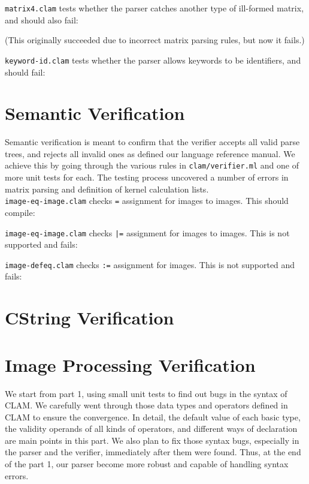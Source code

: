 \texttt{matrix4.clam} tests whether the parser catches another type of ill-formed matrix, and should also fail:

(This originally succeeded due to incorrect matrix parsing rules, but now it fails.)

\texttt{keyword-id.clam} tests whether the parser allows keywords to be identifiers, and should fail:



\section{Semantic Verification}
\label{testing:semantic}

Semantic verification is meant to confirm that the verifier accepts all valid parse trees,
and rejects all invalid ones as defined our language reference manual.
We achieve this by going through the various rules in \texttt{clam/verifier.ml}
and one of more unit tests for each. The testing process uncovered a number of errors
in matrix parsing and definition of kernel calculation lists.\\

\texttt{image-eq-image.clam} checks \texttt{=} assignment for images to images. This should compile:


\texttt{image-eq-image.clam} checks \texttt{|=} assignment for images to images. This is not supported and fails:


\texttt{image-defeq.clam} checks \texttt{:=} assignment for images. This is not supported and fails:


\section{CString Verification}
\label{testing:cstrings}

\section{Image Processing Verification}
\label{test:output}


We start from part 1, using small unit tests to find out bugs in the syntax of CLAM. We carefully went through those data types and operators defined in CLAM to ensure the convergence. In detail, the default value of each basic type, the validity operands of all kinds of operators, and different ways of declaration are main points in this part. We also plan to fix those syntax bugs, especially in the parser and the verifier, immediately after them were found. Thus, at the end of the part 1, our  parser become more robust and capable of handling syntax errors.

